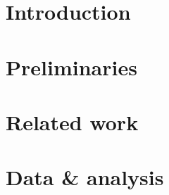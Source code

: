\documentclass[a4paper]{article}
\numberwithin{algorithm}{section}
\numberwithin{figure}{section}
\numberwithin{table}{section}
\numberwithin{equation}{section}
\begin{document}
    \pagebreak


    \tableofcontents

    \pagebreak

    \pagestyle{plain}
    \setcounter{page}{1}
    \setlength{\parindent}{40pt}

    \section{Introduction}
    \label{sec:intro}
    
    \pagebreak
   
    \section{Preliminaries}
    \label{sec:prel}
    
    \pagebreak
    
    \section{Related work}
    \label{sec:relwrk}
    
    \pagebreak
    
    \section{Data \& analysis}
    \label{sec:data}
    
    \pagebreak
    
\end{document}

